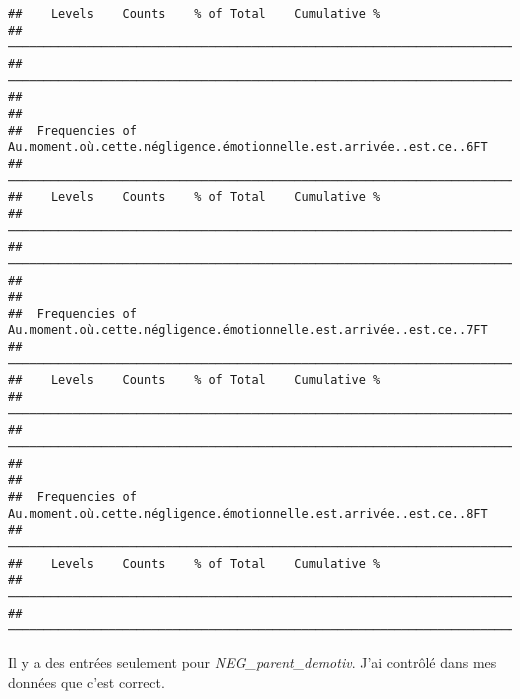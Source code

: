 \documentclass[
]{article}
\begin{document}
\begin{verbatim}
##    Levels    Counts    % of Total    Cumulative %   
##  ────────────────────────────────────────────────────────────────────────────────── 
##  ────────────────────────────────────────────────────────────────────────────────── 
## 
## 
##  Frequencies of Au.moment.où.cette.négligence.émotionnelle.est.arrivée..est.ce..6FT 
##  ────────────────────────────────────────────────────────────────────────────────── 
##    Levels    Counts    % of Total    Cumulative %   
##  ────────────────────────────────────────────────────────────────────────────────── 
##  ────────────────────────────────────────────────────────────────────────────────── 
## 
## 
##  Frequencies of Au.moment.où.cette.négligence.émotionnelle.est.arrivée..est.ce..7FT 
##  ────────────────────────────────────────────────────────────────────────────────── 
##    Levels    Counts    % of Total    Cumulative %   
##  ────────────────────────────────────────────────────────────────────────────────── 
##  ────────────────────────────────────────────────────────────────────────────────── 
## 
## 
##  Frequencies of Au.moment.où.cette.négligence.émotionnelle.est.arrivée..est.ce..8FT 
##  ────────────────────────────────────────────────────────────────────────────────── 
##    Levels    Counts    % of Total    Cumulative %   
##  ────────────────────────────────────────────────────────────────────────────────── 
##  ──────────────────────────────────────────────────────────────────────────────────
\end{verbatim}

Il y a des entrées seulement pour \emph{NEG\_parent\_demotiv}. J'ai
contrôlé dans mes données que c'est correct.
\end{document}
